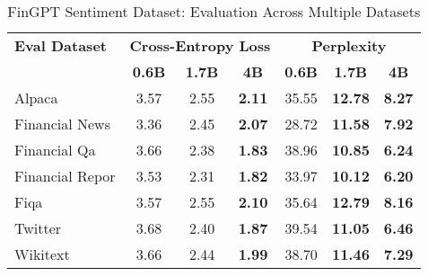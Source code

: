 
\begin{table}[h]
\centering
\caption[FinGPT Sentiment: Evaluation Results]{FinGPT Sentiment Dataset: Evaluation Across Multiple Datasets}
\label{tab:fingpt_results}
\begin{tabular}{l|ccc|ccc}
\hline
\textbf{Eval Dataset} & \multicolumn{3}{c|}{\textbf{Cross-Entropy Loss}} & \multicolumn{3}{c}{\textbf{Perplexity}} \\
\cline{2-4} \cline{5-7}
  & \textbf{0.6B} & \textbf{1.7B} & \textbf{4B} & \textbf{0.6B} & \textbf{1.7B} & \textbf{4B} \\
Alpaca & 3.57 & 2.55 & \textbf{2.11} & 35.55 & \textbf{12.78} & \textbf{8.27} \\
Financial News & 3.36 & 2.45 & \textbf{2.07} & 28.72 & \textbf{11.58} & \textbf{7.92} \\
Financial Qa & 3.66 & 2.38 & \textbf{1.83} & 38.96 & \textbf{10.85} & \textbf{6.24} \\
Financial Repor & 3.53 & 2.31 & \textbf{1.82} & 33.97 & \textbf{10.12} & \textbf{6.20} \\
Fiqa & 3.57 & 2.55 & \textbf{2.10} & 35.64 & \textbf{12.79} & \textbf{8.16} \\
Twitter & 3.68 & 2.40 & \textbf{1.87} & 39.54 & \textbf{11.05} & \textbf{6.46} \\
Wikitext & 3.66 & 2.44 & \textbf{1.99} & 38.70 & \textbf{11.46} & \textbf{7.29} \\
\hline
\end{tabular}
\end{table}

